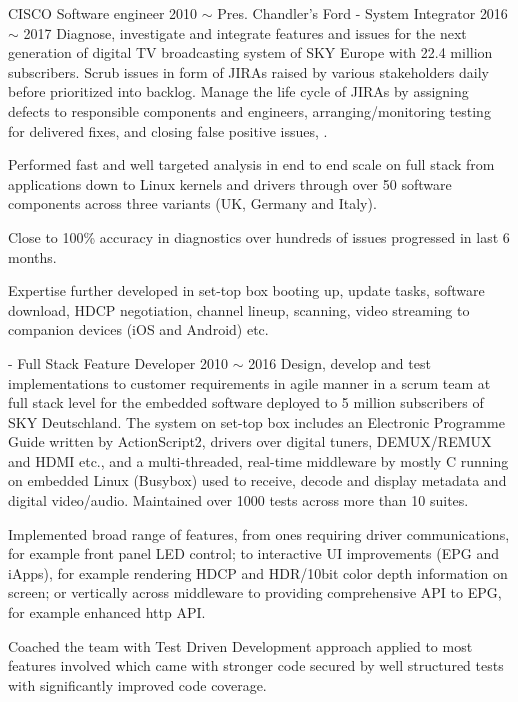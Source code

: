 \begin{cventries}
  \cventry
    {CISCO}
    {Software engineer}
    {2010 $\sim$ Pres.}
    {Chandler's Ford}
    {}
  \cventryX
    {- System Integrator}
    {2016 $\sim$ 2017}
    {Diagnose, investigate and integrate features and issues for the next generation of digital TV broadcasting system of SKY Europe with 22.4 million subscribers. Scrub issues in form of JIRAs raised by various stakeholders daily before prioritized into backlog. Manage the life cycle of JIRAs by assigning defects to responsible components and engineers, arranging/monitoring testing for delivered fixes, and closing false positive issues, .}
    {
      \begin{cvitems}
        \item {Performed fast and well targeted analysis in end to end scale on full stack from applications down to Linux kernels and drivers through over 50 software components across three variants (UK, Germany and Italy).}
        \item{Close to 100\% accuracy in diagnostics over hundreds of issues progressed in last 6 months.}
        \item{Expertise further developed in set-top box booting up, update tasks, software download, HDCP negotiation, channel lineup, scanning, video streaming to companion devices (iOS and Android) etc.}
      \end{cvitems}
    }
  \cventryX
    {- Full Stack Feature Developer}
    {2010 $\sim$ 2016}
    {Design, develop and test implementations to customer requirements in agile manner in a scrum team at full stack level for the embedded software deployed to 5 million subscribers of SKY Deutschland. The system on set-top box includes an Electronic Programme Guide written by ActionScript2, drivers over digital tuners, DEMUX/REMUX and HDMI etc., and a multi-threaded, real-time middleware by mostly C running on embedded Linux (Busybox) used to receive, decode and display metadata and digital video/audio. Maintained over 1000 tests across more than 10 suites.}
    {
      \begin{cvitems}
        \item {Implemented broad range of features, from ones requiring driver communications, for example front panel LED control; to interactive UI improvements (EPG and iApps), for example rendering HDCP and HDR/10bit color depth information on screen; or vertically across middleware to providing comprehensive API to EPG, for example enhanced http API.}
        \item {Coached the team with Test Driven Development approach applied to most features involved which came with stronger code secured by well structured tests with significantly improved code coverage.}

\end{cvitems}}
\end{cventries}
